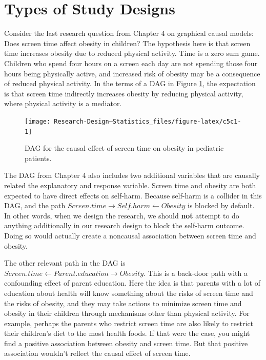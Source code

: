 \documentclass[
]{book}
\begin{document}
\section{Types of Study Designs}\label{types-of-study-designs}

Consider the last research question from Chapter 4 on graphical causal models: Does screen time affect obesity in children? The hypothesis here is that screen time increases obesity due to reduced physical activity. Time is a zero sum game. Children who spend four hours on a screen each day are not spending those four hours being physically active, and increased risk of obesity may be a consequence of reduced physical activity. In the terms of a DAG in Figure \ref{fig:c5c1}, the expectation is that screen time indirectly increases obesity by reducing physical activity, where physical activity is a mediator.

\begin{figure}

{\centering \texttt{[image: Research-Design---Statistics\_files/figure-latex/c5c1-1]} 

}

\caption{DAG for the causal effect of screen time on obesity in pediatric patients.}\label{fig:c5c1}
\end{figure}

The DAG from Chapter 4 also includes two additional variables that are causally related the explanatory and response variable. Screen time and obesity are both expected to have direct effects on self-harm. Because self-harm is a collider in this DAG, and the path \(Screen.time \to Self.harm \gets Obesity\) is blocked by default. In other words, when we design the research, we should \textbf{not} attempt to do anything additionally in our research design to block the self-harm outcome. Doing so would actually create a noncausal association between screen time and obesity.

The other relevant path in the DAG is \(Screen.time \gets Parent.education \to Obesity\). This is a back-door path with a confounding effect of parent education. Here the idea is that parents with a lot of education about health will know something about the risks of screen time and the risks of obesity, and they may take actions to minimize screen time and obesity in their children through mechanisms other than physical activity. For example, perhaps the parents who restrict screen time are also likely to restrict their children's diet to the most health foods. If that were the case, you might find a positive association between obesity and screen time. But that positive association wouldn't reflect the causal effect of screen time.
\end{document}
